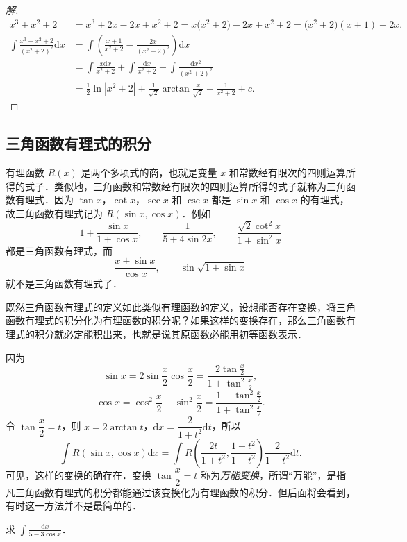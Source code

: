 \begin{proof}[解]
\[
\begin{aligned}
x^{3}+x^{2}+2 &= x^{3}+2x-2x+x^{2}+2
= x\big(x^{2}+2\big)-2x+x^{2}+2
= \big(x^{2}+2\big)(x+1)-2x.\\
\int\frac{x^{3}+x^{2}+2}{\left(x^{2}+2\right)^{2}}\mathrm{d}x
&= \int\left(\frac{x+1}{x^{2}+2}-\frac{2x}{\left(x^{2}+2\right)^{2}}\right)\mathrm{d}x\\
&= \int\frac{x\mathrm{d}x}{x^{2}+2}+\int\frac{\mathrm{d}x}{x^{2}+2}-\int\frac{\mathrm{d}x^{2}}{\left(x^{2}+2\right)^{2}}\\
&= \frac{1}{2}\ln\left|x^{2}+2\right|+\frac{1}{\sqrt{2}}\arctan\frac{x}{\sqrt{2}}+\frac{1}{x^{2}+2}+c.
\end{aligned}
\]
\end{proof}

\subsection{三角函数有理式的积分}

有理函数 $R(x)$ 是两个多项式的商，也就是变量 $x$ 和常数经有限次的四则运算所得的式子．类似地，三角函数和常数经有限次的四则运算所得的式子就称为三角函数有理式．因为 $\tan x$，$\cot x$，$\sec x$ 和 $\csc x$ 都是 $\sin x$ 和 $\cos x$ 的有理式，故三角函数有理式记为 $R(\sin x,\cos x)$．例如
\[
1+\frac{\sin x}{1+\cos x},\qquad \frac{1}{5+4\sin 2x},\qquad \frac{\sqrt{2}\cot^{2}x}{1+\sin^{2}x}
\]
都是三角函数有理式，而
\[
\frac{x+\sin x}{\cos x},\qquad \sin\sqrt{1+\sin x}
\]
就不是三角函数有理式了．

既然三角函数有理式的定义如此类似有理函数的定义，设想能否存在变换，将三角函数有理式的积分化为有理函数的积分呢？如果这样的变换存在，那么三角函数有理式的积分就必定能积出来，也就是说其原函数必能用初等函数表示．

因为
\[
\sin x = 2\sin\frac{x}{2}\cos\frac{x}{2} = \frac{2\tan\frac{x}{2}}{1+\tan^{2}\frac{x}{2}},
\]
\[
\cos x = \cos^{2}\frac{x}{2}-\sin^{2}\frac{x}{2} = \frac{1-\tan^{2}\frac{x}{2}}{1+\tan^{2}\frac{x}{2}}.
\]
令 $\tan\dfrac{x}{2} = t$，则 $x = 2\arctan t$，$\mathrm{d}x = \dfrac{2}{1+t^{2}}\mathrm{d}t$，所以
\[
\int R(\sin x,\cos x)\mathrm{d}x
= \int R\left(\frac{2t}{1+t^{2}},\frac{1-t^{2}}{1+t^{2}}\right)\frac{2}{1+t^{2}}\mathrm{d}t.
\]
可见，这样的变换的确存在．变换 $\tan\dfrac{x}{2} = t$ 称为\emph{万能变换}，所谓``万能''，是指凡三角函数有理式的积分都能通过该变换化为有理函数的积分．但后面将会看到，有时这一方法并不是最简单的．

\begin{example}\label{ex:6-2-24}
求 $\displaystyle\int\frac{\mathrm{d}x}{5-3\cos x}$．
\end{example}

